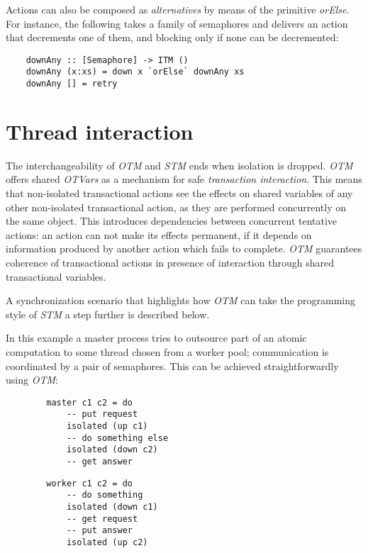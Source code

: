 Actions can also be composed as \emph{alternatives} by means of the primitive \emph{orElse}. For instance, the following takes a family of semaphores and delivers an action that decrements one of them, and blocking only if none can be decremented:
\begin{Verbatim}
    downAny :: [Semaphore] -> ITM ()
    downAny (x:xs) = down x `orElse` downAny xs
    downAny [] = retry
\end{Verbatim}

\section{Thread interaction}

The interchangeability of \emph{OTM} and \emph{STM} ends when isolation is dropped.
\emph{OTM} offers shared \emph{OTVars} as a mechanism for safe \emph{transaction interaction}.
This means that non-isolated transactional actions see the effects on shared variables of any other non-isolated transactional action, as they are performed concurrently on the same object.
This introduces dependencies between concurrent tentative actions: an action can not make its effects permanent, if it depends on information produced by another action which fails to complete.
\emph{OTM} guarantees coherence of transactional actions in presence of interaction through shared transactional variables.

A synchronization scenario that highlights how \emph{OTM} can take the programming style of \emph{STM} a step further is described below.

In this example a master process tries to outsource part of an atomic computation to some thread chosen from a worker pool; communication is coordinated by a pair of semaphores.
This can be achieved straightforwardly using \emph{OTM}:\\


\begin{minipage}{0.45\textwidth}
\begin{Verbatim}
        master c1 c2 = do
            -- put request
            isolated (up c1)
            -- do something else
            isolated (down c2)
            -- get answer
\end{Verbatim}
\end{minipage}
\begin{minipage}{0.45\textwidth}
\begin{Verbatim}
        worker c1 c2 = do
            -- do something
            isolated (down c1)
            -- get request
            -- put answer
            isolated (up c2)
\end{Verbatim}
\end{minipage}
\\

